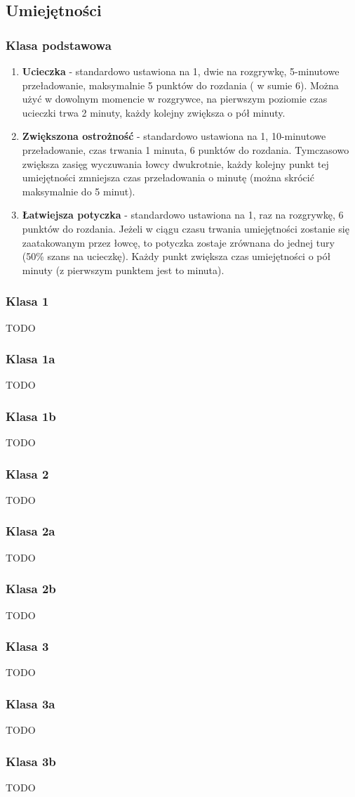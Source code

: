 \documentclass[a4paper,11pt,notitlepage]{article}
\begin{document}
\subsection{Umiejętności}
\subsubsection{Klasa podstawowa}
\begin{enumerate}
\item \textbf{Ucieczka} - standardowo ustawiona na 1, dwie na rozgrywkę, 5-minutowe przeładowanie, maksymalnie 5 punktów do rozdania ( w sumie 6). Można użyć w dowolnym momencie w rozgrywce, na pierwszym poziomie czas ucieczki trwa 2 minuty, każdy kolejny zwiększa o pół minuty.

\item \textbf{Zwiększona ostrożność} - standardowo ustawiona na 1, 10-minutowe przeładowanie, czas trwania 1 minuta, 6 punktów do rozdania. Tymczasowo zwiększa zasięg wyczuwania łowcy dwukrotnie, każdy kolejny punkt tej umiejętności zmniejsza czas przeładowania o minutę (można skrócić maksymalnie do 5 minut).

\item \textbf{Łatwiejsza potyczka} - standardowo ustawiona na 1, raz na rozgrywkę, 6 punktów do rozdania. Jeżeli w ciągu czasu trwania umiejętności zostanie się zaatakowanym przez łowcę, to potyczka zostaje zrównana do jednej tury (50\% szans na ucieczkę).  Każdy punkt zwiększa czas umiejętności o pół minuty (z pierwszym punktem jest to minuta).

\end{enumerate}

\subsubsection{Klasa 1}
TODO
\subsubsection{Klasa 1a}
TODO
\subsubsection{Klasa 1b}
TODO

\subsubsection{Klasa 2}
TODO
\subsubsection{Klasa 2a}
TODO
\subsubsection{Klasa 2b}
TODO

\subsubsection{Klasa 3}
TODO
\subsubsection{Klasa 3a}
TODO
\subsubsection{Klasa 3b}
TODO
\end{document}

